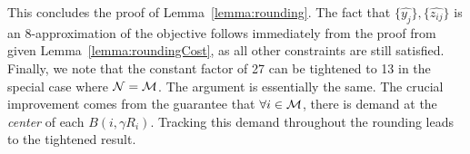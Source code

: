 This concludes the proof of Lemma~\ref{lemma:rounding}. The fact that $\{ \hat{y_j} \}, \{ \hat{z_{ij}} \}$ is an 8-approximation of the objective follows immediately from the proof from \cite{kMedianLP} given Lemma~\ref{lemma:roundingCost}, as all other constraints are still satisfied. Finally, we note that the constant factor of 27 can be tightened to 13 in the special case where $\mathcal {N} = \mathcal{M}$. The argument is essentially the same. The crucial improvement comes from the guarantee that $\forall i \in \mathcal{M}$, there is demand at the \textit{center} of each $B(i, \gamma R_i)$. Tracking this demand throughout the rounding leads to the tightened result.

















